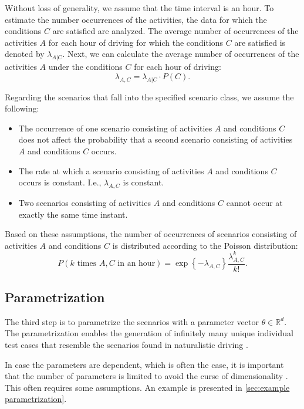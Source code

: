 Without loss of generality, we assume that the time interval is an hour. To estimate the number occurrences of the activities, the data for which the conditions $C$ are satisfied are analyzed. The average number of occurrences of the activities $A$ for each hour of driving for which the conditions $C$ are satisfied is denoted by $\lambda_{A|C}$. Next, we can calculate the average number of occurrences of the activities $A$ under the conditions $C$ for each hour of driving:
\begin{equation}
	\lambda_{A,C} = \lambda_{A|C} \cdot P(C).
\end{equation}

Regarding the scenarios that fall into the specified scenario class, we assume the following:
\begin{itemize}
	\item The occurrence of one scenario consisting of activities $A$ and conditions $C$ does not affect the probability that a second scenario consisting of activities $A$ and conditions $C$ occurs.
	\item The rate at which a scenario consisting of activities $A$ and conditions $C$ occurs is constant. I.e., $\lambda_{A,C}$ is constant.
	\item Two scenarios consisting of activities $A$ and conditions $C$ cannot occur at exactly the same time instant.
\end{itemize}
Based on these assumptions, the number of occurrences of scenarios consisting of activities $A$ and conditions $C$ is distributed according to the Poisson distribution:
\begin{equation}
	P(k\text{ times }A,C\text{ in an hour}) = \exp \left\{-\lambda_{A,C} \right\} \frac{\lambda_{A,C}^k}{k!}.
\end{equation}



\subsection{Parametrization}
\label{sec:parametrization}

The third step is to parametrize the scenarios with a parameter vector $\theta \in \mathbb{R}^d$. The parametrization enables the generation of infinitely many unique individual test cases that resemble the scenarios found in naturalistic driving \cite{deGelder2017assessment,elrofai2018scenario}.

In case the parameters are dependent, which is often the case, it is important that the number of parameters is limited to avoid the curse of dimensionality \cite{scott2015multivariate}. This often requires some assumptions. An example is presented in \cref{sec:example parametrization}.




